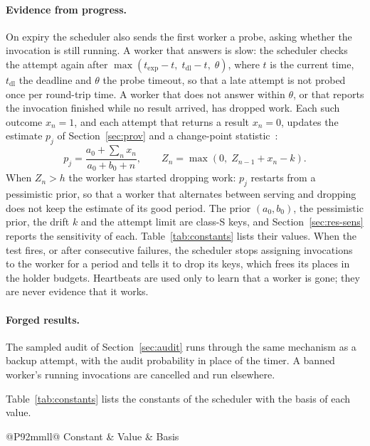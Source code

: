 \paragraph{Evidence from progress.}
On expiry the scheduler also sends the first worker a probe, asking whether the invocation is still running. A
worker that answers is slow: the scheduler checks the attempt again after
$\max\!\left(t_{\mathrm{exp}} - t,\; t_{\mathrm{dl}} - t,\; \theta\right)$, where $t$ is the current time,
$t_{\mathrm{dl}}$ the deadline and $\theta$ the probe timeout, so that a late attempt is not probed once per
round-trip time. A worker that does not answer within $\theta$, or that reports the invocation finished while no result
arrived, has dropped work. Each such outcome $x_n = 1$, and each attempt that returns a result $x_n = 0$, updates the
estimate $p_j$ of Section~\ref{sec:prov} and a change-point statistic~\cite{page1954cusum}:
\begin{equation}
p_j = \frac{a_0 + \sum_n x_n}{a_0 + b_0 + n}, \qquad
Z_n = \max\!\left(0,\; Z_{n-1} + x_n - k\right).
\label{eq:drop}
\end{equation}
When $Z_n > h$ the worker has started dropping work: $p_j$ restarts from a pessimistic prior, so that a worker that
alternates between serving and dropping does not keep the estimate of its good period. The prior $(a_0, b_0)$, the
pessimistic prior, the drift $k$ and the attempt limit are class-S keys, and Section~\ref{sec:res-sens} reports the
sensitivity of each. Table~\ref{tab:constants} lists their values. When the test fires, or after consecutive failures, the scheduler
stops assigning invocations to the worker for a period and tells it to drop its keys, which frees its places in the
holder budgets. Heartbeats are used only to learn that a worker is gone; they are never evidence that it works.

\paragraph{Forged results.}
The sampled audit of Section~\ref{sec:audit} runs through the same mechanism as a backup attempt, with the audit
probability in place of the timer. A banned worker's running invocations are cancelled and run elsewhere.

Table~\ref{tab:constants} lists the constants of the scheduler with the basis of each value.

\begin{table}[t]
\caption{Constants of the scheduler. ``Swept'': a design constant whose sensitivity Section~\ref{sec:res-sens}
reports; ``varied'': an axis of the experiments; ``derived'': computed from other constants.}
\label{tab:constants}
\small
\begin{tabular}{@{}P{92mm}ll@{}}
\toprule
Constant & Value & Basis \\
\midrule

\end{tabular}
\end{table}

